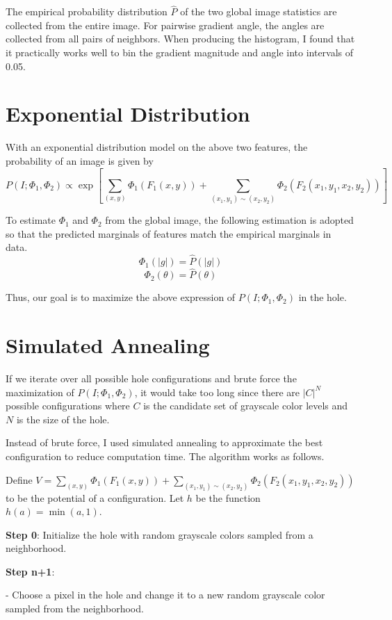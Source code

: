 \documentclass[11pt,letterpaper]{article}
\begin{document}
The empirical probability distribution $\hat P$ of the two global image statistics are collected from the entire image. For pairwise gradient angle, the angles are collected from all pairs of neighbors. When producing the histogram, I found that it practically works well to bin the gradient magnitude and angle into intervals of 0.05.

\section{Exponential Distribution}

With an exponential distribution model on the above two features, the probability of an image is given by
\[P(I; \Phi_1,\Phi_2) \propto \exp\left[\sum_{(x,y)}\Phi_1(F_1(x,y)) + \sum_{(x_1,y_1)\sim (x_2,y_2)}\Phi_2(F_2(x_1,y_1,x_2,y_2))\right]\]

To estimate $\Phi_1$ and $\Phi_2$ from the global image, the following estimation is adopted so that the predicted marginals of features match the empirical marginals in data.
\[\Phi_1(|g|) = \hat P(|g|)\]
\[\Phi_2(\theta) = \hat P(\theta)\]

Thus, our goal is to maximize the above expression of $P(I; \Phi_1,\Phi_2)$ in the hole.

\section{Simulated Annealing}

If we iterate over all possible hole configurations and brute force the maximization of $P(I; \Phi_1,\Phi_2)$, it would take too long since there are $|C|^N$ possible configurations where $C$ is the candidate set of grayscale color levels and $N$ is the size of the hole.

Instead of brute force, I used simulated annealing to approximate the best configuration to reduce computation time. The algorithm works as follows.

Define $V = \sum_{(x,y)}\Phi_1(F_1(x,y)) + \sum_{(x_1,y_1)\sim (x_2,y_2)}\Phi_2(F_2(x_1,y_1,x_2,y_2))$ to be the potential of a configuration. Let $h$ be the function $h(a) = \min(a,1)$.

\textbf{Step 0}: Initialize the hole with random grayscale colors sampled from a neighborhood.

\textbf{Step n+1}: 

- Choose a pixel in the hole and change it to a new random grayscale color sampled from the neighborhood.
\end{document}
